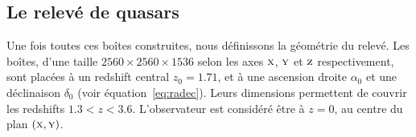 \documentclass[11pt, twoside, a4paper, openright]{report}
\begin{document}


\subsection{Le relevé de quasars}
\label{subsec:qso}
Une fois toutes ces boîtes construites, nous définissons la géométrie du relevé. Les boîtes, d'une taille $\num{2560}\times\num{2560}\times\num{1536}$ selon les axes $\textsc{x}$, $\textsc{y}$ et $\textsc{z}$ respectivement, sont placées à un redshift central $z_0 = 1.71$, et à une ascension droite $\alpha_0$ et une déclinaison $\delta_0$ (voir équation~\ref{eq:radec}). Leurs dimensions permettent de couvrir les redshifts $1.3 < z < 3.6$. L'observateur est considéré être à $z=0$, au centre du plan $(\textsc{x},\textsc{y})$.
\end{document}
